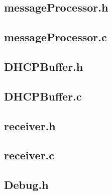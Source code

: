 \documentclass[11pt,a4paper]{scrartcl}
\begin{document}
\subsection{messageProcessor.h}


\subsection{messageProcessor.c}


\subsection{DHCPBuffer.h}


\subsection{DHCPBuffer.c}


\subsection{receiver.h}


\subsection{receiver.c}


\subsection{Debug.h}

\end{document}
